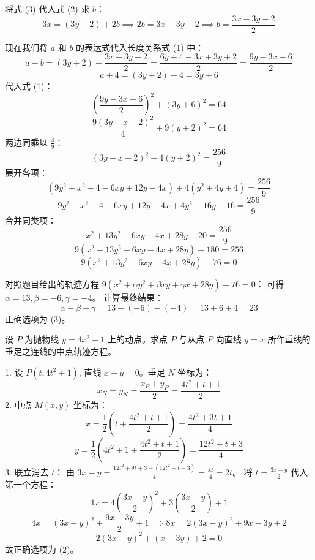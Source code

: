 \begin{questions}
\begin{solution}
将式 (3) 代入式 (2) 求 $b$：
\[
3x = (3y + 2) + 2b \implies 2b = 3x - 3y - 2 \implies b = \frac{3x - 3y - 2}{2}
\]

现在我们将 $a$ 和 $b$ 的表达式代入长度关系式 (1) 中：
\[
a - b = (3y + 2) - \frac{3x - 3y - 2}{2} = \frac{6y + 4 - 3x + 3y + 2}{2} = \frac{9y - 3x + 6}{2}
\]
\[
a + 4 = (3y + 2) + 4 = 3y + 6
\]
代入式 (1)：
\[
\left( \frac{9y - 3x + 6}{2} \right)^2 + (3y + 6)^2 = 64
\]
\[
\frac{9(3y - x + 2)^2}{4} + 9(y + 2)^2 = 64
\]
两边同乘以 $\frac{4}{9}$：
\[
(3y - x + 2)^2 + 4(y + 2)^2 = \frac{256}{9}
\]
展开各项：
\[
(9y^2 + x^2 + 4 - 6xy + 12y - 4x) + 4(y^2 + 4y + 4) = \frac{256}{9}
\]
\[
9y^2 + x^2 + 4 - 6xy + 12y - 4x + 4y^2 + 16y + 16 = \frac{256}{9}
\]
合并同类项：
\[
x^2 + 13y^2 - 6xy - 4x + 28y + 20 = \frac{256}{9}
\]
\[
9(x^2 + 13y^2 - 6xy - 4x + 28y) + 180 = 256
\]
\[
9(x^2 + 13y^2 - 6xy - 4x + 28y) - 76 = 0
\]

对照题目给出的轨迹方程 $9(x^2 + \alpha y^2 + \beta xy + \gamma x + 28y) - 76 = 0$：
可得 $\alpha = 13, \beta = -6, \gamma = -4$。
计算最终结果：
\[
\alpha - \beta - \gamma = 13 - (-6) - (-4) = 13 + 6 + 4 = 23
\]
正确选项为 (3)。
\end{solution}

\question
设 $P$ 为抛物线 $y = 4x^2 + 1$ 上的动点。求点 $P$ 与从点 $P$ 向直线 $y = x$ 所作垂线的垂足之连线的中点轨迹方程。

\begin{solution}
1. 设 $P(t, 4t^2 + 1)$, 直线 $x - y = 0$。垂足 $N$ 坐标为：
\[ x_N = y_N = \frac{x_P + y_P}{2} = \frac{4t^2 + t + 1}{2} \]
2. 中点 $M(x, y)$ 坐标为：
\[ x = \frac{1}{2}(t + \frac{4t^2 + t + 1}{2}) = \frac{4t^2 + 3t + 1}{4} \]
\[ y = \frac{1}{2}(4t^2 + 1 + \frac{4t^2 + t + 1}{2}) = \frac{12t^2 + t + 3}{4} \]
3. 联立消去 $t$：
由 $3x - y = \frac{12t^2 + 9t + 3 - (12t^2 + t + 3)}{4} = \frac{8t}{4} = 2t$。
将 $t = \frac{3x - y}{2}$ 代入第一个方程：
\[ 4x = 4(\frac{3x - y}{2})^2 + 3(\frac{3x - y}{2}) + 1 \]
\[ 4x = (3x - y)^2 + \frac{9x - 3y}{2} + 1 \implies 8x = 2(3x - y)^2 + 9x - 3y + 2 \]
\[ 2(3x - y)^2 + (x - 3y) + 2 = 0 \]
故正确选项为 (2)。
\end{solution}


\end{questions}
